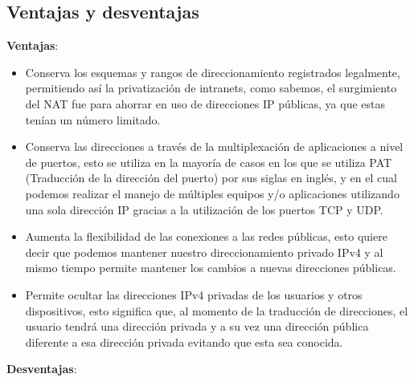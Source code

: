 \documentclass[
	12pt, %
	fleqn, %
	a4paper, %
	oneside, %
]{LegrandOrangeBook}
\begin{document}
\subsection{Ventajas y desventajas}
\textbf{Ventajas}:
\begin{itemize}
\item Conserva los esquemas y rangos de direccionamiento registrados legalmente, permitiendo así la privatización de intranets, como sabemos, el surgimiento del NAT fue para ahorrar en uso de direcciones IP públicas, ya que estas tenían un número limitado.
\item Conserva las direcciones a través de la multiplexación de aplicaciones a nivel de puertos, esto se utiliza en la mayoría de casos en los que se utiliza PAT (Traducción de la dirección del puerto) por sus siglas en inglés, y en el cual podemos realizar el manejo de múltiples equipos y/o aplicaciones utilizando una sola dirección IP gracias a la utilización de los puertos TCP y UDP.
\item Aumenta la flexibilidad de las conexiones a las redes públicas, esto quiere decir que podemos mantener nuestro direccionamiento privado IPv4 y al mismo tiempo permite mantener los cambios a nuevas direcciones públicas.
\item Permite ocultar las direcciones IPv4 privadas de los usuarios y otros dispositivos, esto significa que, al momento de la traducción de direcciones, el usuario tendrá una dirección privada y a su vez una dirección pública diferente a esa dirección privada evitando que esta sea conocida.
\end{itemize}
\textbf{Desventajas}:
\end{document}
